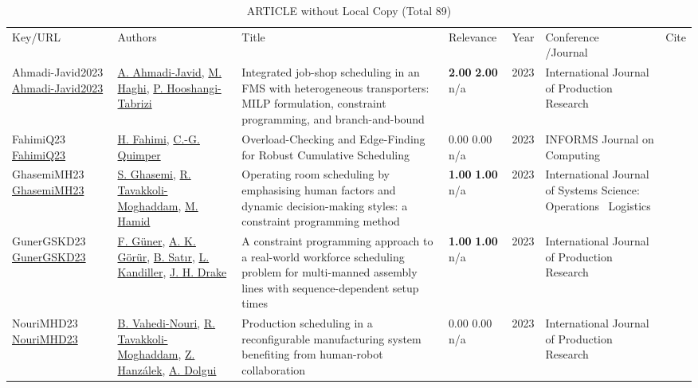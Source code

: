 {\scriptsize
\begin{longtable}{p{3cm}p{5cm}p{10cm}p{1cm}rp{2.5cm}l}
\rowcolor{white}\caption{ARTICLE without Local Copy (Total 89)}\\ \toprule
\rowcolor{white}Key/URL & Authors & Title & Relevance &Year & \shortstack{Conference\\/Journal} & Cite\\ \midrule
\endhead
\bottomrule
\endfoot
Ahmadi-Javid2023 \href{http://dx.doi.org/10.1080/00207543.2023.2230489}{Ahmadi-Javid2023} & \hyperref[auth:a1759]{A. Ahmadi-Javid}, \hyperref[auth:a1760]{M. Haghi}, \hyperref[auth:a1761]{P. Hooshangi-Tabrizi} & Integrated job-shop scheduling in an FMS with heterogeneous transporters: MILP formulation, constraint programming, and branch-and-bound & \noindent{}\textbf{2.00} \textbf{2.00} n/a & 2023 & \cellcolor{red!20}International Journal of Production Research & \cite{Ahmadi-Javid2023}\\
FahimiQ23 \href{http://dx.doi.org/10.1287/ijoc.2021.0138}{FahimiQ23} & \hyperref[auth:a122]{H. Fahimi}, \hyperref[auth:a37]{C.-G. Quimper} & Overload-Checking and Edge-Finding for Robust Cumulative Scheduling & \noindent{}\textcolor{black!50}{0.00} \textcolor{black!50}{0.00} n/a & 2023 & \cellcolor{red!20}INFORMS Journal on Computing & \cite{FahimiQ23}\\
GhasemiMH23 \href{http://dx.doi.org/10.1080/23302674.2023.2224509}{GhasemiMH23} & \hyperref[auth:a980]{S. Ghasemi}, \hyperref[auth:a429]{R. Tavakkoli-Moghaddam}, \hyperref[auth:a981]{M. Hamid} & Operating room scheduling by emphasising human factors and dynamic decision-making styles: a constraint programming method & \noindent{}\textbf{1.00} \textbf{1.00} n/a & 2023 & \cellcolor{red!20}International Journal of Systems Science: Operations \  Logistics & \cite{GhasemiMH23}\\
GunerGSKD23 \href{http://dx.doi.org/10.1080/00207543.2023.2226772}{GunerGSKD23} & \hyperref[auth:a1425]{F. G\"{u}ner}, \hyperref[auth:a1426]{A. K. G\"{o}r\"{u}r}, \hyperref[auth:a1427]{B. Satır}, \hyperref[auth:a1428]{L. Kandiller}, \hyperref[auth:a1429]{J. H. Drake} & A constraint programming approach to a real-world workforce scheduling problem for multi-manned assembly lines with sequence-dependent setup times & \noindent{}\textbf{1.00} \textbf{1.00} n/a & 2023 & \cellcolor{red!20}International Journal of Production Research & \cite{GunerGSKD23}\\
NouriMHD23 \href{http://dx.doi.org/10.1080/00207543.2023.2173503}{NouriMHD23} & \hyperref[auth:a736]{B. Vahedi-Nouri}, \hyperref[auth:a429]{R. Tavakkoli-Moghaddam}, \hyperref[auth:a945]{Z. Hanzálek}, \hyperref[auth:a946]{A. Dolgui} & Production scheduling in a reconfigurable manufacturing system benefiting from human-robot collaboration & \noindent{}\textcolor{black!50}{0.00} \textcolor{black!50}{0.00} n/a & 2023 & \cellcolor{red!20}International Journal of Production Research & \cite{NouriMHD23}\\

\end{longtable}}
